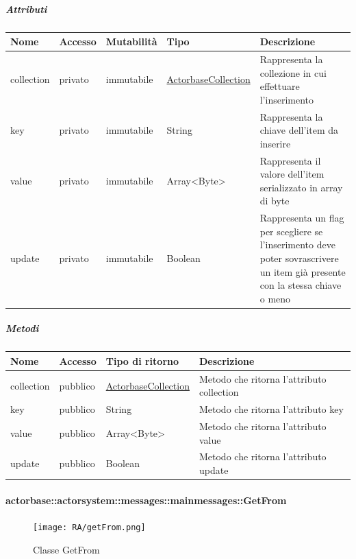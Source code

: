 \documentclass{scalatekids-article}
\begin{document}
\subparagraph{Attributi}
\begin{tabular}{| p{2cm} | p{1.5cm} | p{2cm} | p{3cm} | p{8.5cm} |}
  \hline
  Nome & Accesso & Mutabilità & Tipo & Descrizione\\
  \hline
  collection & privato & immutabile & \hyperref[sec:actorbase::actorsystem::utils::ActorbaseCollection]{ActorbaseCollection} & Rappresenta la collezione in cui effettuare l'inserimento \\
  \hline
  key & privato & immutabile & String & Rappresenta la chiave dell'item da inserire\\
  \hline
  value & privato & immutabile & Array<Byte> & Rappresenta il valore dell'item serializzato in array di byte\\
  \hline
  update & privato & immutabile & Boolean & Rappresenta un flag per scegliere se l'inserimento deve poter sovrascrivere un item già presente con la stessa chiave o meno\\
  \hline
\end{tabular}

\subparagraph{Metodi}
\begin{tabular}{| l | l | l | l |}
  \hline
  Nome & Accesso & Tipo di ritorno & Descrizione\\
  \hline
  collection & pubblico & \hyperref[sec:actorbase::actorsystem::utils::ActorbaseCollection]{ActorbaseCollection} & Metodo che ritorna l'attributo collection\\
  \hline
  key & pubblico & String & Metodo che ritorna l'attributo key\\
  \hline
  value & pubblico & Array<Byte> & Metodo che ritorna l'attributo value\\
  \hline
  update & pubblico & Boolean & Metodo che ritorna l'attributo update\\
  \hline
\end{tabular}

\paragraph{actorbase::actorsystem::messages::mainmessages::GetFrom}
\label{sec:actorbase::actorsystem::messages::mainmessages::GetFrom}

\begin{figure}[H]
  \begin{center}
    \texttt{[image: RA/getFrom.png]}
    \caption{Classe GetFrom}
  \end{center}
\end{figure}
\end{document}
